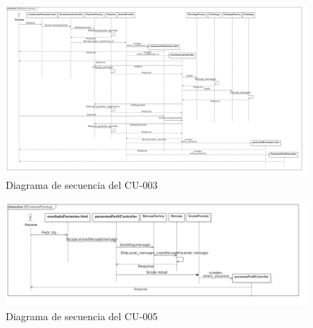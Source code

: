 \begin{landscape}

\begin{figure}[htbp] 
    \centering
    \includegraphics[height=0.8\textwidth,keepaspectratio]{figuras/diagrama/SDRealizarCuestionario.png}
    \caption{Diagrama de secuencia del CU-003}
    \label{fig:diag_sec_cu003}
\end{figure}	

\end{landscape}


\begin{figure}[htbp] 
    \centering
    \includegraphics[width=1\textwidth]{figuras/diagrama/SDContactarPsicologo.png}
    \caption{Diagrama de secuencia del CU-005}
    \label{fig:diag_sec_cu005}
\end{figure}	